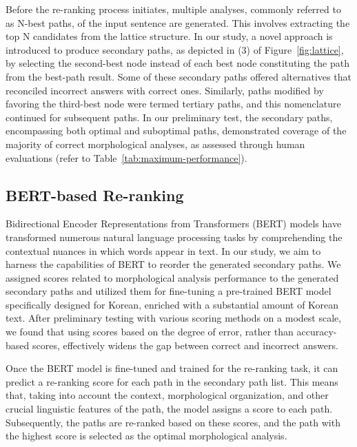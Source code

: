 \documentclass[AMS,STIX2COL]{WileyNJD-v2}
\begin{document}
    Before the re-ranking process initiates, multiple analyses, commonly referred to as N-best paths, of the input sentence are generated.
    This involves extracting the top N candidates from the lattice structure.
    In our study, a novel approach is introduced to produce secondary paths, as depicted in (3) of Figure~\ref{fig:lattice}, by selecting the second-best node instead of each best node constituting the path from the best-path result.
    Some of these secondary paths offered alternatives that reconciled incorrect answers with correct ones.
    Similarly, paths modified by favoring the third-best node were termed tertiary paths, and this nomenclature continued for subsequent paths.
    In our preliminary test, the secondary paths, encompassing both optimal and suboptimal paths, demonstrated coverage of the majority of correct morphological analyses, as assessed through human evaluations (refer to Table~\ref{tab:maximum-performance}).

    \subsection{BERT-based Re-ranking}\label{subsec:bert-based-reranking}

    Bidirectional Encoder Representations from Transformers (BERT) models have transformed numerous natural language processing tasks by comprehending the contextual nuances in which words appear in text.
    In our study, we aim to harness the capabilities of BERT to reorder the generated secondary paths.
    We assigned scores related to morphological analysis performance to the generated secondary paths and utilized them for fine-tuning a pre-trained BERT model specifically designed for Korean, enriched with a substantial amount of Korean text.
    After preliminary testing with various scoring methods on a modest scale, we found that using scores based on the degree of error, rather than accuracy-based scores, effectively widens the gap between correct and incorrect answers.

    Once the BERT model is fine-tuned and trained for the re-ranking task, it can predict a re-ranking score for each path in the secondary path list.
    This means that, taking into account the context, morphological organization, and other crucial linguistic features of the path, the model assigns a score to each path.
    Subsequently, the paths are re-ranked based on these scores, and the path with the highest score is selected as the optimal morphological analysis.
\end{document}
